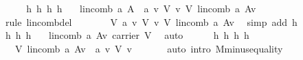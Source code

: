 \begin{isabellebody}
%
\isadelimproof
%
\endisadelimproof
%
\isatagproof
{}\isamarkupfalse%
\ {\isacharminus}\isanewline
\ \ \isamarkupfalse%
\ h{}\ h{}\ h{}\ h{}\ \isamarkupfalse%
\ {}{\isacharcolon}\ {\isachardoublequoteopen}lincomb\ a\ A\ {\isacharequal}\ {\isacharparenleft}{\isacharparenleft}a\ v{\isacharparenright}\ {\isasymodot}\isactrlbsub V\isactrlesub \ v{\isacharparenright}\ {\isasymoplus}\isactrlbsub V\isactrlesub \ lincomb\ a\ {\isacharparenleft}A{\isacharminus}{\isacharbraceleft}v{\isacharbraceright}{\isacharparenright}{\isachardoublequoteclose}\ \isanewline
\ \ \ \ \isamarkupfalse%
\ {\isacharparenleft}rule\ lincomb{\isacharunderscore}del{}{\isacharparenright}\isanewline
\ \ \isamarkupfalse%
\ {}\ \isamarkupfalse%
\ {}{\isacharcolon}\ {\isachardoublequoteopen}{\isasymzero}\isactrlbsub V\isactrlesub {\isacharequal}\ {\isacharparenleft}{\isacharparenleft}a\ v{\isacharparenright}\ {\isasymodot}\isactrlbsub V\isactrlesub \ v{\isacharparenright}\ {\isasymoplus}\isactrlbsub V\isactrlesub \ lincomb\ a\ {\isacharparenleft}A{\isacharminus}{\isacharbraceleft}v{\isacharbraceright}{\isacharparenright}{\isachardoublequoteclose}\ \isamarkupfalse%
\ {\isacharparenleft}simp\ add{\isacharcolon}\ h{}{\isacharparenright}\isanewline
\ \ \isamarkupfalse%
\ h{}\ h{}\ h{}\ \isamarkupfalse%
\ {}{\isacharcolon}\ {\isachardoublequoteopen}lincomb\ a\ {\isacharparenleft}A{\isacharminus}{\isacharbraceleft}v{\isacharbraceright}{\isacharparenright}\ {\isasymin}carrier\ V{\isachardoublequoteclose}\ \isamarkupfalse%
\ auto\ \isanewline
\ \ \isamarkupfalse%
\ {}\ h{}\ h{}\ h{}\ h{}\ \isamarkupfalse%
\ {}{\isacharcolon}\ {\isachardoublequoteopen}\ {\isasymominus}\isactrlbsub V\isactrlesub \ lincomb\ a\ {\isacharparenleft}A{\isacharminus}{\isacharbraceleft}v{\isacharbraceright}{\isacharparenright}\ {\isacharequal}\ {\isacharparenleft}{\isacharparenleft}a\ v{\isacharparenright}\ {\isasymodot}\isactrlbsub V\isactrlesub \ v{\isacharparenright}{\isachardoublequoteclose}\ \isanewline
\ \ \ \ \isamarkupfalse%
\ {\isacharparenleft}auto\ intro{\isacharbang}{\isacharcolon}\ M{\isachardot}minus{\isacharunderscore}equality{\isacharparenright}\isanewline
\ \ \isamarkupfalse%

\end{isabellebody}
